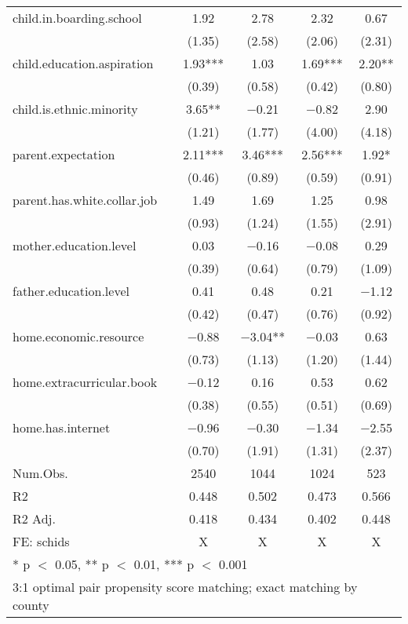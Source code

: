 \documentclass[
  man,floatsintext]{apa7}
\begin{document}
\begin{table}
\begin{tabular}[t]{lcccc}
child.in.boarding.school & \num{1.92} & \num{2.78} & \num{2.32} & \num{0.67}\\
 & (\num{1.35}) & (\num{2.58}) & (\num{2.06}) & (\num{2.31})\\
child.education.aspiration & \num{1.93}*** & \num{1.03} & \num{1.69}*** & \num{2.20}**\\
 & (\num{0.39}) & (\num{0.58}) & (\num{0.42}) & (\num{0.80})\\
child.is.ethnic.minority & \num{3.65}** & \num{-0.21} & \num{-0.82} & \num{2.90}\\
 & (\num{1.21}) & (\num{1.77}) & (\num{4.00}) & (\num{4.18})\\
parent.expectation & \num{2.11}*** & \num{3.46}*** & \num{2.56}*** & \num{1.92}*\\
 & (\num{0.46}) & (\num{0.89}) & (\num{0.59}) & (\num{0.91})\\
parent.has.white.collar.job & \num{1.49} & \num{1.69} & \num{1.25} & \num{0.98}\\
 & (\num{0.93}) & (\num{1.24}) & (\num{1.55}) & (\num{2.91})\\
mother.education.level & \num{0.03} & \num{-0.16} & \num{-0.08} & \num{0.29}\\
 & (\num{0.39}) & (\num{0.64}) & (\num{0.79}) & (\num{1.09})\\
father.education.level & \num{0.41} & \num{0.48} & \num{0.21} & \num{-1.12}\\
 & (\num{0.42}) & (\num{0.47}) & (\num{0.76}) & (\num{0.92})\\
home.economic.resource & \num{-0.88} & \num{-3.04}** & \num{-0.03} & \num{0.63}\\
 & (\num{0.73}) & (\num{1.13}) & (\num{1.20}) & (\num{1.44})\\
home.extracurricular.book & \num{-0.12} & \num{0.16} & \num{0.53} & \num{0.62}\\
 & (\num{0.38}) & (\num{0.55}) & (\num{0.51}) & (\num{0.69})\\
home.has.internet & \num{-0.96} & \num{-0.30} & \num{-1.34} & \num{-2.55}\\
 & (\num{0.70}) & (\num{1.91}) & (\num{1.31}) & (\num{2.37})\\
\midrule
Num.Obs. & \num{2540} & \num{1044} & \num{1024} & \num{523}\\
R2 & \num{0.448} & \num{0.502} & \num{0.473} & \num{0.566}\\
R2 Adj. & \num{0.418} & \num{0.434} & \num{0.402} & \num{0.448}\\
FE: schids & X & X & X & X\\
\bottomrule
\multicolumn{5}{l}{\rule{0pt}{1em}* p $<$ 0.05, ** p $<$ 0.01, *** p $<$ 0.001}\\
\multicolumn{5}{l}{\rule{0pt}{1em}3:1 optimal pair propensity score matching; exact matching by county}\\
\end{tabular}
\end{table}
\end{document}
